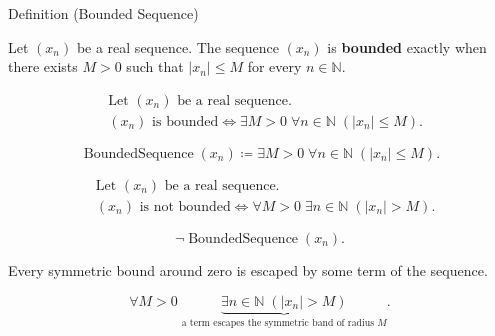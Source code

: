 
\begin{definitionbox}{Definition (Bounded Sequence)}
\begin{definition}
\label{def:bounded-sequence}
Let $(x_n)$ be a real sequence. The sequence $(x_n)$ is
\textbf{bounded} exactly when there exists $M > 0$ such that
$|x_n| \le M$ for every $n \in \mathbb{N}$.
\end{definition}
\end{definitionbox}

\begin{remark*}
\[
\begin{aligned}
&\text{Let } (x_n) \text{ be a real sequence.}\\
&(x_n) \text{ is bounded}
\Longleftrightarrow
\exists M > 0\;
\forall n \in \mathbb{N}\;(|x_n| \le M).
\end{aligned}
\]
\end{remark*}

\begin{remark*}
\[
\operatorname{BoundedSequence}(x_n)
\coloneqq
\exists M > 0\;
\forall n \in \mathbb{N}\;(|x_n| \le M).
\]
\end{remark*}

\begin{remark*}
\[
\begin{aligned}
&\text{Let } (x_n) \text{ be a real sequence.}\\
&(x_n) \text{ is not bounded}
\Longleftrightarrow
\forall M > 0\;
\exists n \in \mathbb{N}\;(|x_n| > M).
\end{aligned}
\]
\end{remark*}

\begin{remark*}
\[
\neg\operatorname{BoundedSequence}(x_n).
\]
\end{remark*}

\begin{remark*}
Every symmetric bound around zero is escaped by some term of the sequence.
\end{remark*}

\begin{remark*}
\[
\forall M > 0\;
\underbrace{\exists n \in \mathbb{N}\;(|x_n| > M)}
_{\text{a term escapes the symmetric band of radius } M}.
\]
\end{remark*}

